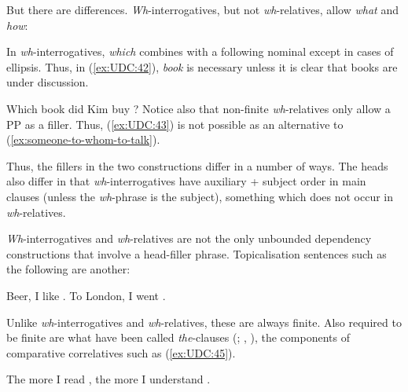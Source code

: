 \documentclass[output=paper
,notxmath 
 	        ,biblatex
                ,babelshorthands
                ,newtxmath
                ,draftmode
                ,colorlinks, citecolor=brown
]{langscibook}
\begin{document}
\noindent
But there are differences. \emph{Wh}-interrogatives, but not
\emph{wh}-relatives, allow \emph{what} and \emph{how}:

\eal
\label{ex:UDC:40}
\zl

\eal
\label{ex:UDC:41}
\zl

\noindent
In \emph{wh}-interrogatives, \emph{which} combines with a following
nominal except in cases of ellipsis. Thus, in (\ref{ex:UDC:42}), \emph{book} is
necessary unless it is clear that books are under discussion.

\ea
\label{ex:UDC:42}
Which book did Kim buy \trace{}?
\z
\noindent
Notice also that non-finite \emph{wh}-relatives only allow a PP as a
filler. Thus, (\ref{ex:UDC:43}) is not possible as an alternative to (\ref{ex:someone-to-whom-to-talk}).

\begin{exe}
     \label{ex:UDC:43}
\end{exe}

\noindent
Thus, the fillers in the two constructions differ in a number of ways.
The heads also differ in that \emph{wh}-interrogatives have auxiliary +
subject order in main clauses (unless the \emph{wh}-phrase is the
subject), something which does not occur in \emph{wh}-relatives.

\emph{Wh}-interrogatives and \emph{wh}-relatives are not the only
unbounded dependency constructions that involve a head-filler phrase.
Topicalisation sentences such as the following are another:

\begin{exe} \ex \begin{xlist} \label{ex:UDC:44}
\ex Beer, I like \trace{}.
\ex To London, I went \trace{}.
\end{xlist}
\end{exe}

\noindent
Unlike \emph{wh}-interrogatives and \emph{wh}-relatives, these are
always finite. Also required to be finite are what have been called
\emph{the}-clauses (\citealp{Borsley:04}; \citealp[490--494,524--527]{Sag:10a}, \citealp{Borsley:11}), the components of
comparative correlatives such as (\ref{ex:UDC:45}).

\begin{exe}
\ex \label{ex:UDC:45}
The more I read \trace{}, the more I understand \trace{}.
\end{exe}
\end{document}
